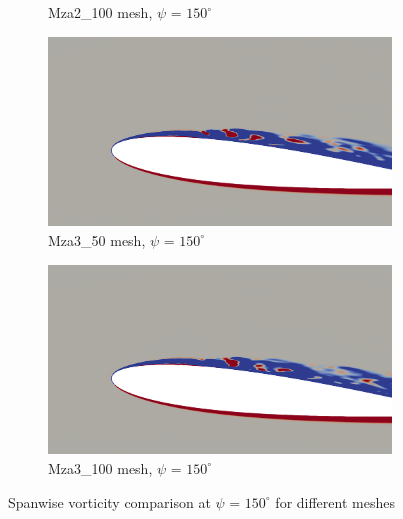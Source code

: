 \begin{figure}[H]
\begin{subfigure}[b]{0.475\textwidth}
		\caption{Mza2\_100 mesh, $\psi$ = $150^\circ$}
		\label{fig:Mza2_100_sp_psi150}
	\end{subfigure}
	\begin{subfigure}[b]{0.475\textwidth}
		\centering
		\includegraphics[width=1\textwidth]{figures/zonal_adapt_results/vorticity_plots/v2/Mza3_50/spavg/phase_150.png}
		\caption{Mza3\_50 mesh, $\psi$ = $150^\circ$}
		\label{fig:Mza3_50_sp_psi150}
	\end{subfigure}
	\begin{subfigure}[b]{0.475\textwidth}
		\centering
		\includegraphics[width=1\textwidth]{figures/zonal_adapt_results/vorticity_plots/v2/Mza3_100/spavg/phase_150.png}
		\caption{Mza3\_100 mesh, $\psi$ = $150^\circ$}
		\label{fig:Mza3_100_sp_psi150}
	\end{subfigure}
	\caption{Spanwise vorticity comparison at $\psi$ = $150^\circ$ for different meshes}
	\label{fig:vorticity_zonal_150}
\end{figure}






